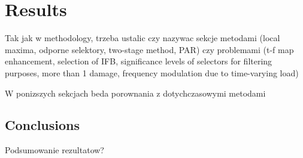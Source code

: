 \chapter{Results}

\label{ch:results}

Tak jak w methodology, trzeba ustalic czy nazywac sekcje metodami (local maxima, odporne selektory, two-stage method, PAR) czy problemami (t-f map enhancement, selection of IFB, significance levels of selectors for filtering purposes, more than 1 damage, frequency modulation due to time-varying load)

W ponizszych sekcjach beda porownania z dotychczasowymi metodami














\section{Conclusions}


Podsumowanie rezultatow?